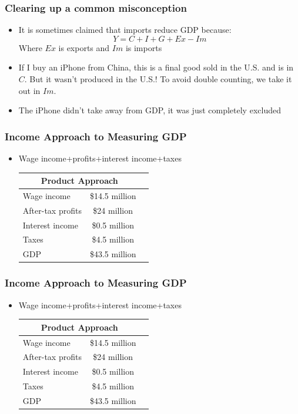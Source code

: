 \documentclass{beamer}
\begin{document}
\begin{frame}
\frametitle[alignment=center]{Clearing up a common misconception}
\begin{itemize}
\item It is sometimes claimed that imports reduce GDP because:
$$Y=C+I+G+Ex-Im$$
Where $Ex$ is exports and $Im$ is imports
\item If I buy an iPhone from China, this is a final good sold in the U.S. and is in $C$. But it wasn't produced in the U.S.!  To avoid double counting, we take it out in $Im$.  
\item The iPhone didn't take away from GDP, it was just completely excluded
\end{itemize}
\end{frame}




\begin{frame}
\frametitle[alignment=center]{Income Approach to Measuring GDP}
\begin{itemize}
\item Wage income+profits+interest income+taxes
\begin{table}
\begin{tabular}{lcc}
\hline\hline
\multicolumn{2}{c}{Product Approach}\\
\hline
Wage income & \$14.5 million\\
After-tax profits & \$24 million\\
Interest income & \$0.5 million\\
Taxes & \$4.5 million\\
\hline
GDP & \$43.5 million\\
\hline\hline
\end{tabular}
\end{table}
\end{itemize}
\end{frame}


\begin{frame}
\frametitle[alignment=center]{Income Approach to Measuring GDP}
\begin{itemize}
\item Wage income+profits+interest income+taxes
\begin{table}
\begin{tabular}{lcc}
\hline\hline
\multicolumn{2}{c}{Product Approach}\\
\hline
Wage income & \$14.5 million\\
After-tax profits & \$24 million\\
Interest income & \$0.5 million\\
Taxes & \$4.5 million\\
\hline
GDP & \$43.5 million\\
\hline\hline
\end{tabular}
\end{table}
\end{itemize}
\end{frame}
\end{document}
